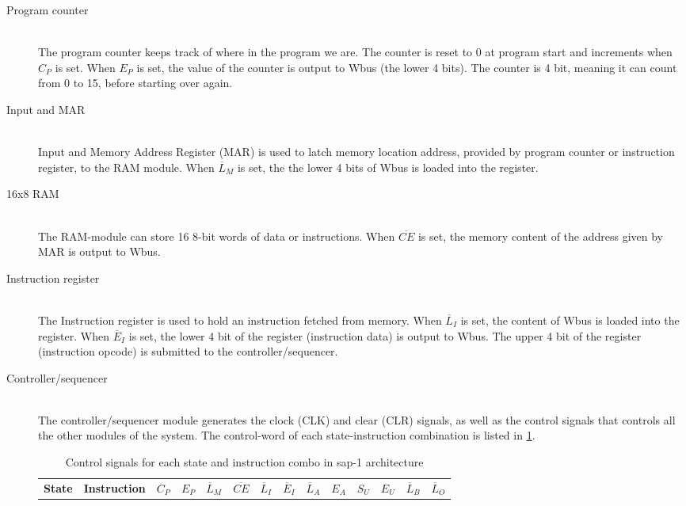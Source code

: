 \begin{description}
    \item[Program counter] \hfill \\
    The program counter keeps track of where in the program we are. The counter is reset to 0 at program start and increments when $C_P$ is set. When $E_P$ is set, the value of the counter is output to Wbus (the lower 4 bits). The counter is 4 bit, meaning it can count from 0 to 15, before starting over again.
    \item[Input and MAR] \hfill \\
    Input and Memory Address Register (MAR) is used to latch memory location address, provided by program counter or instruction register, to the RAM module. When $\overline{L}_M$ is set, the the lower 4 bits of Wbus is loaded into the register.  
    \item[16x8 RAM] \hfill \\
    The RAM-module can store 16 8-bit words of data or instructions. When $\overline{CE}$ is set, the memory content of the address given by MAR is output to Wbus.
    \item[Instruction register] \hfill \\
    The Instruction register is used to hold an instruction fetched from memory. When $\overline{L}_I$ is set, the content of Wbus is loaded into the register. When $\overline{E}_I$ is set, the lower 4 bit of the register (instruction data) is output to Wbus. The upper 4 bit of the register (instruction opcode) is submitted to the controller/sequencer.
    \item[Controller/sequencer] \hfill \\
    The controller/sequencer module generates the clock (CLK) and clear (CLR) signals, as well as the control signals that controls all the other modules of the system. The control-word of each state-instruction combination is listed in \cref{tab:sap1control}.
    \begin{table}[hbpt]
    \centering
    \caption{\label{tab:sap1control}Control signals for each state and instruction combo in \gls{sap-1} architecture}
    \begin{tabular}{p{0.8cm}lp{0.3cm}p{0.3cm}p{0.3cm}p{0.3cm}p{0.3cm}p{0.3cm}p{0.3cm}p{0.3cm}p{0.3cm}p{0.3cm}p{0.3cm}p{0.3cm}}
    \textbf{State} & \textbf{Instruction} & $C_P$ & $E_P$ & $\overline{L}_M$ & $\overline{CE}$ & $\overline{L}_I$ & $\overline{E}_I$ & $\overline{L}_A$ & $E_A$ & $S_U$ & $E_U$ & $\overline{L}_B$ & $\overline{L}_O$\\

\end{tabular}
\end{table}
\end{description}
